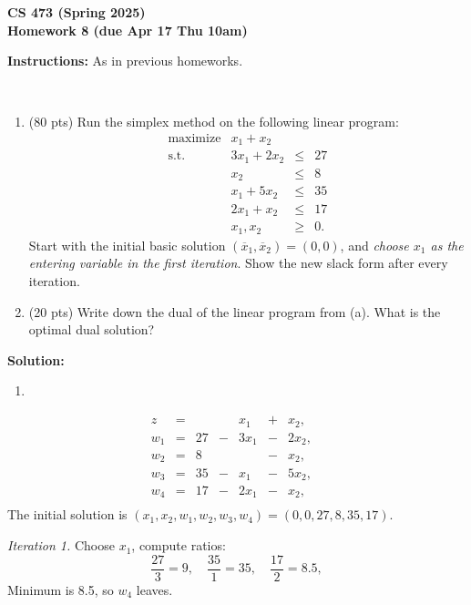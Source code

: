 \documentclass[11pt]{article}
\begin{document}
\begin{center}\Large\bf 
CS 473 (Spring 2025)\\
Homework 8 (due Apr 17 Thu 10am)
\end{center}

\medskip\noindent
{\bf Instructions:} As in previous homeworks.

\begin{description}

\bigskip
\item[Problem 8.1:]\

\begin{enumerate}
\item[(a)] (80 pts)
Run the simplex method 
on the following linear program:
\[ \begin{array}{lrcl}
\mbox{maximize} & x_1 + x_2 &&\\
\mbox{s.t.} & 3x_1 + 2x_2 &\le& 27\\
&x_2&\le&8\\
& x_1+5x_2&\le&35\\
& 2x_1 + x_2 &\le& 17\\
&x_1,x_2&\ge& 0.
\end{array}\]
Start with the initial basic solution
$(\overline{x}_1,\overline{x}_2)=(0,0)$, and
{\em choose $x_1$ as the entering variable in the first iteration}.
Show the new slack form after every iteration.
\item[(b)] (20 pts)
Write down the dual of the linear program from (a).
What is the optimal dual solution?
\end{enumerate}


\newpage
\textbf{Solution:}
\begin{enumerate}
  \item[(a)]
\end{enumerate}
\[
\begin{array}{rcrcrcrcr|r}
z & = & & & x_1 & + & x_2,\\\hline
w_1 & = & 27 & - & 3x_1 & - & 2x_2, \\
w_2 & = & 8 & & & - & x_2,\\
w_3 & = & 35 & - & x_1 & - & 5x_2, & \\
w_4 & = & 17 & - & 2x_1 & - & x_2, &\\
\end{array}
\]
The initial solution is \((x_1,x_2,w_1,w_2,w_3,w_4)=(0,0,27,8,35,17)\).

\textit{Iteration 1.} Choose \(x_1\), compute ratios:
\[
\frac{27}{3}=9,\quad
\frac{35}{1}=35,\quad
\frac{17}{2}=8.5,
\]
Minimum is 8.5, so \(w_4\) leaves.


\end{description}
\end{document}
